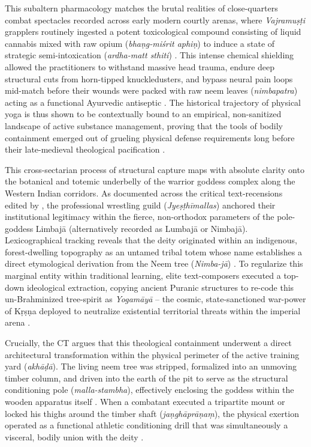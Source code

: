 \documentclass[11pt,twoside,letterpaper]{article}
\begin{document}
This subaltern pharmacology matches the brutal realities of close-quarters combat spectacles recorded across early modern courtly arenas, where \textit{Vajramuṣṭi} grapplers routinely ingested a potent toxicological compound consisting of liquid cannabis mixed with raw opium (\textit{bhaṇg-miśrit aphiṇ}) to induce a state of strategic semi-intoxication (\textit{ardha-matt sthiti}) \citep{Sandesara1948}. This intense chemical shielding allowed the practitioners to withstand massive head trauma, endure deep structural cuts from horn-tipped knuckledusters, and bypass neural pain loops mid-match before their wounds were packed with raw neem leaves (\textit{nimbapatra}) acting as a functional Ayurvedic antiseptic \citep{Sandesara1948}. The historical trajectory of physical yoga is thus shown to be contextually bound to an empirical, non-sanitized landscape of active substance management, proving that the tools of bodily containment emerged out of grueling physical defense requirements long before their late-medieval theological pacification \citep{Sandesara1948, Wujastyk2025}.

This cross-sectarian process of structural capture maps with absolute clarity onto the botanical and totemic underbelly of the warrior goddess complex along the Western Indian corridors. As documented across the critical text-recensions edited by \citet{MP_7}, the professional wrestling guild (\textit{Jyeṣṭhīmallas}) anchored their institutional legitimacy within the fierce, non-orthodox parameters of the pole-goddess Limbajā (alternatively recorded as Lumbajā or Nimbajā). Lexicographical tracking reveals that the deity originated within an indigenous, forest-dwelling topography as an untamed tribal totem whose name establishes a direct etymological derivation from the Neem tree (\textit{Nimba-jā}) \citep{Abbasi2001, Sandesara1948}. To regularize this marginal entity within traditional learning, elite text-composers executed a top-down ideological extraction, copying ancient Puranic structures to re-code this un-Brahminized tree-spirit as \textit{Yogamāyā} -- the cosmic, state-sanctioned war-power of Kṛṣṇa deployed to neutralize existential territorial threats within the imperial arena \citep{Das1968, Sandesara1948}.

Crucially, the CT argues that this theological containment underwent a direct architectural transformation within the physical perimeter of the active training yard (\textit{akhāḍā}). The living neem tree was stripped, formalized into an unmoving timber column, and driven into the earth of the pit to serve as the structural conditioning pole (\textit{malla-stambha}), effectively enclosing the goddess within the wooden apparatus itself \citep{MP_7, Khasgivale1929}. When a combatant executed a tripartite mount or locked his thighs around the timber shaft (\textit{jaṇghāprāṇaṃ}), the physical exertion operated as a functional athletic conditioning drill that was simultaneously a visceral, bodily union with the deity \citep{MP_7}. 
\end{document}
